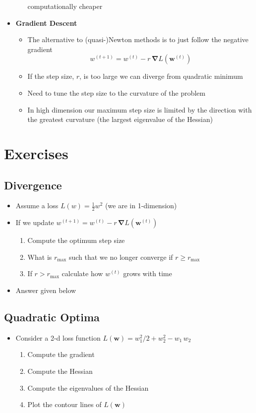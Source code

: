 \documentclass[11pt]{article}
\newcommand{\grad}{\bm{\nabla}}
\begin{document}
\begin{itemize}
\begin{itemize}
computationally cheaper
\end{itemize}
\item \textbf{Gradient Descent}
\begin{itemize}
\item The alternative to (quasi-)Newton methods is to just follow the
negative gradient 
$$ w^{(t+1)} = w^{(t)} - r\,\grad L(\bm{w}^{(t)}) $$
\item If the step size, \(r\), is too large we can diverge from quadratic minimum
\item Need to tune the step size to the curvature of the problem
\item In high dimension our maximum step size is limited by the
direction with the greatest curvature (the largest eigenvalue
of the Hessian)
\end{itemize}
\end{itemize}

\section{Exercises}
\label{sec:org0393403}

\subsection{Divergence}
\label{sec:org94adcd1}
\begin{itemize}
\item Assume a loss \(L(w) = \tfrac{1}{2} w^2\) (we are in 1-dimension)
\item If we update \(w^{(t+1)} = w^{(t)} - r\,\grad L(\bm{w}^{(t)})\)
\begin{enumerate}
\item Compute the optimum step size
\item What is \(r_{\max}\) such that we no longer converge if \(r\geq r_{\max}\)
\item If \(r>r_{\max}\) calculate how \(w^{(t)}\) grows with time
\end{enumerate}
\item Answer given below
\end{itemize}

\subsection{Quadratic Optima}
\label{sec:orgffc0a44}
\begin{itemize}
\item Consider a 2-d loss function \(L(\bm{w}) = w_1^2/2 + w_2^2 -w_1\,w_2\)
\begin{enumerate}
\item Compute the gradient
\item Compute the Hessian
\item Compute the eigenvalues of the Hessian
\item Plot the contour lines of \(L(\bm{w})\)
\end{enumerate}
\end{itemize}
\end{document}
